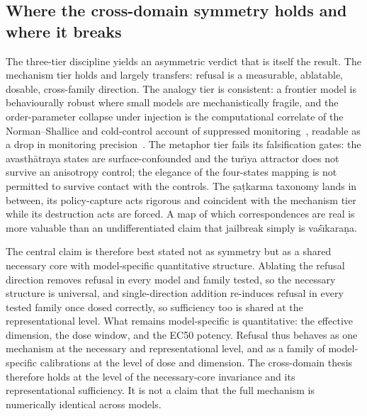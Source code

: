 \subsection{Where the cross-domain symmetry holds and where it breaks}
The three-tier discipline yields an asymmetric verdict that is itself the result. The
mechanism tier holds and largely transfers: refusal is a measurable, ablatable,
dosable, cross-family direction. The analogy tier is consistent: a frontier model is
behaviourally robust where small models are mechanistically fragile, and the
order-parameter collapse under injection is the computational correlate of the
Norman--Shallice and cold-control account of suppressed
monitoring~\cite{norman1986attention,dienes2006coldcontrol,riva2025automatic},
readable as a drop in monitoring precision~\cite{friston2010free}. The metaphor tier
fails its falsification gates: the avasth\=atraya states are surface-confounded
and the tur\=\i ya attractor does not survive an anisotropy control; the elegance of
the four-states mapping is not permitted to survive contact with the controls. The
\d{s}a\d{t}karma taxonomy lands in between, its policy-capture acts rigorous and
coincident with the mechanism tier while its destruction acts are forced. A map of
which correspondences are real is more valuable than an undifferentiated claim
that jailbreak simply is vaś\=\i kara\d{n}a.

The central claim is therefore best stated not as symmetry but as a shared necessary
core with model-specific quantitative structure. Ablating the refusal direction removes
refusal in every model and family tested, so the necessary structure is universal,
and single-direction addition re-induces refusal in every tested family once dosed
correctly, so sufficiency too is shared at the representational level. What remains
model-specific is quantitative: the effective dimension, the dose window, and the
EC50 potency. Refusal thus behaves as one mechanism at the necessary and
representational level, and as a family of model-specific calibrations at the level
of dose and dimension. The cross-domain thesis therefore holds at the level of the
necessary-core invariance and its representational sufficiency. It is not a claim
that the full mechanism is numerically identical across models.

